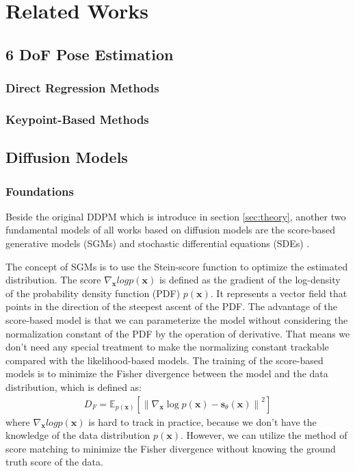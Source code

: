 \documentclass[12pt,DIV14,BCOR12mm,a4paper,footinclude=false,headinclude,parskip=half-,twoside,openright,cleardoublepage=empty,toc=index,bibliography=totoc,listof=totoc]{scrreprt}
\numberwithin{equation}{chapter}
\begin{document}
\chapter{Related Works}
\section{6 DoF Pose Estimation}

\subsection{Direct Regression Methods}

\subsection{Keypoint-Based Methods} 

\section{Diffusion Models}
\subsection{Foundations}
Beside the original DDPM \cite{sohldickstein2015deep,ho2020denoising} which is introduce in section \ref{sec:theory}, another two fundamental models of all works based on diffusion models are the score-based generative models (SGMs) \cite{song2020generative,song2020improved} and stochastic differential equations (SDEs) \cite{song2021maximum,song2021scorebased}.

The concept of SGMs is to use the Stein-score function to optimize the estimated distribution. The score $\nabla_{\mathbf{x}}log p(\mathbf{x})$ is defined as the gradient of the log-density of the probability density function (PDF) $p(\mathbf{x})$. It represents a vector field that points in the direction of the steepest ascent of the PDF. The advantage of the score-based model is that we can parameterize the model without considering the normalization constant of the PDF by the operation of derivative. That means we don't need any special treatment to make the normalizing constant trackable compared with the likelihood-based models. The training of the score-based models is to minimize the Fisher divergence between the model and the data distribution, which is defined as:
\begin{align}\label{eq:sgm}
  D_{F} = \mathbb{E}_{p(\mathbf{x})}\left[\left\lVert\nabla_{\mathbf{x}}\log p(\mathbf{x}) - \mathbf{s}_{\theta}(\mathbf{x})\right\rVert^{2}\right]
\end{align}
where $\nabla_{\mathbf{x}}log p(\mathbf{x})$ is hard to track in practice, because we don't have the knowledge of the data distribution $p(\mathbf{x})$. However, we can utilize the method of score matching \cite{10.5555/1046920.1088696,6795935} to minimize the Fisher divergence without knowing the ground truth score of the data.
\end{document}
